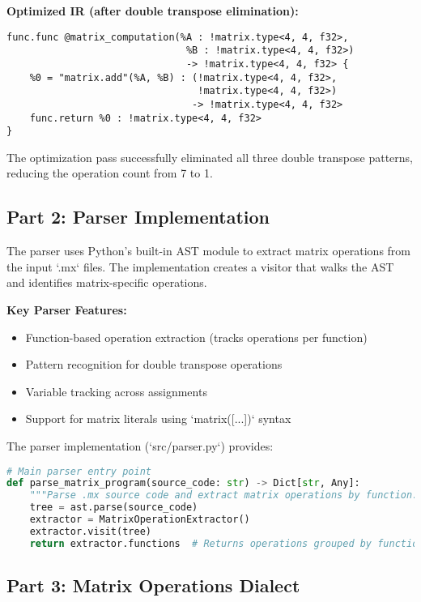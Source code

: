 \documentclass[11pt,a4paper]{article}
\begin{document}
\textbf{Optimized IR (after double transpose elimination):}
\begin{lstlisting}[caption=Optimized IR with Transposes Eliminated]
func.func @matrix_computation(%A : !matrix.type<4, 4, f32>, 
                               %B : !matrix.type<4, 4, f32>) 
                               -> !matrix.type<4, 4, f32> {
    %0 = "matrix.add"(%A, %B) : (!matrix.type<4, 4, f32>, 
                                 !matrix.type<4, 4, f32>) 
                                -> !matrix.type<4, 4, f32>
    func.return %0 : !matrix.type<4, 4, f32>
}
\end{lstlisting}

The optimization pass successfully eliminated all three double transpose patterns, reducing the operation count from 7 to 1.

\subsection{Part 2: Parser Implementation}

The parser uses Python's built-in AST module to extract matrix operations from the input `.mx` files. The implementation creates a visitor that walks the AST and identifies matrix-specific operations.

\textbf{Key Parser Features:}
\begin{itemize}
    \item Function-based operation extraction (tracks operations per function)
    \item Pattern recognition for double transpose operations
    \item Variable tracking across assignments
    \item Support for matrix literals using `matrix([...])` syntax
\end{itemize}

The parser implementation (`src/parser.py`) provides:

\begin{lstlisting}[language=Python, caption=Parser Interface]
# Main parser entry point
def parse_matrix_program(source_code: str) -> Dict[str, Any]:
    """Parse .mx source code and extract matrix operations by function."""
    tree = ast.parse(source_code)
    extractor = MatrixOperationExtractor()
    extractor.visit(tree)
    return extractor.functions  # Returns operations grouped by function
\end{lstlisting}

\subsection{Part 3: Matrix Operations Dialect}
\end{document}
